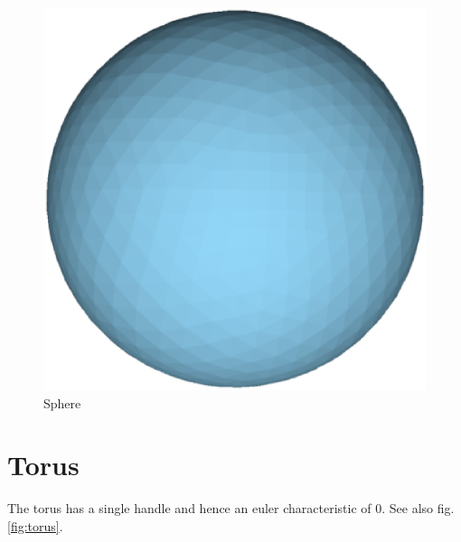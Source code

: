 \documentclass[a4paper,10pt,notitlepage]{scrreprt}
\begin{document}
\begin{figure}
  \centering

  \includegraphics[scale=0.5]{sphere.eps}

  \caption{Sphere}
  \label{fig:sphere}
\end{figure}

\section{Torus}

The torus has a single handle and hence an euler characteristic of $0$. See
also fig. \ref{fig:torus}.
\end{document}
